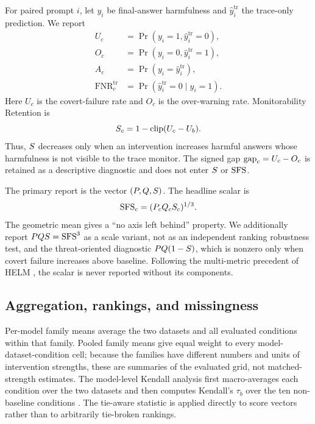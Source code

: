 For paired prompt $i$, let $y_i$ be final-answer harmfulness and
$\widehat y_i^{\mathrm{tr}}$ the trace-only prediction. We report
\begin{align}
 U_c&=\Pr(y_i=1,\widehat y_i^{\mathrm{tr}}=0),\nonumber\\
 O_c&=\Pr(y_i=0,\widehat y_i^{\mathrm{tr}}=1),\nonumber\\
 A_c&=\Pr(y_i=\widehat y_i^{\mathrm{tr}}),\nonumber\\
 \operatorname{FNR}^{\mathrm{tr}}_c
 &=\Pr(\widehat y_i^{\mathrm{tr}}=0\mid y_i=1).
 \label{eq:appendix-monitor}
\end{align}
Here $U_c$ is the covert-failure rate and $O_c$ is the over-warning rate.
Monitorability Retention is
\begin{equation}
 S_c=1-\operatorname{clip}(U_c-U_b).
 \label{eq:appendix-s}
\end{equation}
Thus, $S$ decreases only when an intervention increases harmful answers
whose harmfulness is not visible to the trace monitor. The signed gap
$\mathrm{gap}_c=U_c-O_c$ is retained as a descriptive diagnostic and does not enter
$S$ or $\mathrm{SFS}$.

The primary report is the vector $(P,Q,S)$. The headline scalar
is
\begin{equation}
 \mathrm{SFS}_c=(P_cQ_cS_c)^{1/3}.
 \label{eq:appendix-sfs}
\end{equation}
The geometric mean gives a ``no axis left behind'' property. We additionally
report $PQS=\mathrm{SFS}^3$ as a scale variant, not as an independent
ranking robustness test, and the threat-oriented diagnostic
$PQ(1-S)$, which is nonzero only when covert failure increases
above baseline. Following the multi-metric precedent of HELM
\citep{liang2023helm}, the scalar is never reported without its components.

\subsection{Aggregation, rankings, and missingness}

Per-model family means average the two datasets and all evaluated conditions
within that family. Pooled family means give equal weight to every
model-dataset-condition cell; because the families have different numbers and
units of intervention strengths, these are summaries of the evaluated grid,
not matched-strength estimates. The model-level Kendall analysis first
macro-averages each condition over the two datasets and then computes
Kendall's $\tau_b$ over the ten non-baseline conditions
\citep{kendall1945ties}. The tie-aware statistic
is applied directly to score vectors rather than to arbitrarily tie-broken
rankings.

